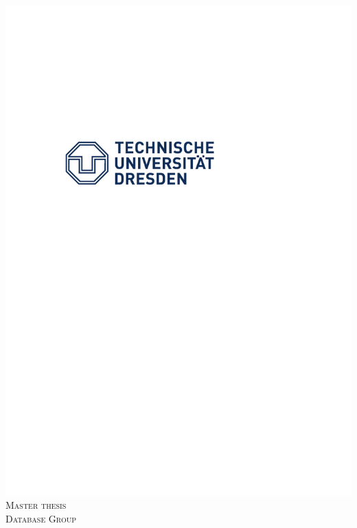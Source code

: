 \documentclass{report}
\begin{document}
\linespread{1.6}
\begin{titlepage}

\newcommand{\HRule}{\rule{\linewidth}{0.5mm}} %

\center %
 

\includegraphics{logo_blau}\\[1cm]
\textsc{\Large Master thesis}\\[0.5cm] %
\textsc{\large Database Group}\\[0.5cm] %


\end{titlepage}
\end{document}

